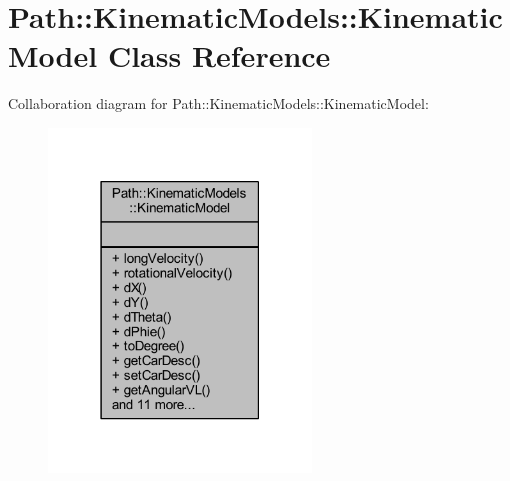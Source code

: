 \hypertarget{class_path_1_1_kinematic_models_1_1_kinematic_model}{}\section{Path\+:\+:Kinematic\+Models\+:\+:Kinematic\+Model Class Reference}
\label{class_path_1_1_kinematic_models_1_1_kinematic_model}


Collaboration diagram for Path\+:\+:Kinematic\+Models\+:\+:Kinematic\+Model\+:\nopagebreak
\begin{figure}[H]
\begin{center}
\leavevmode
\includegraphics[width=198pt]{d1/d1c/class_path_1_1_kinematic_models_1_1_kinematic_model__coll__graph}
\end{center}
\end{figure}
